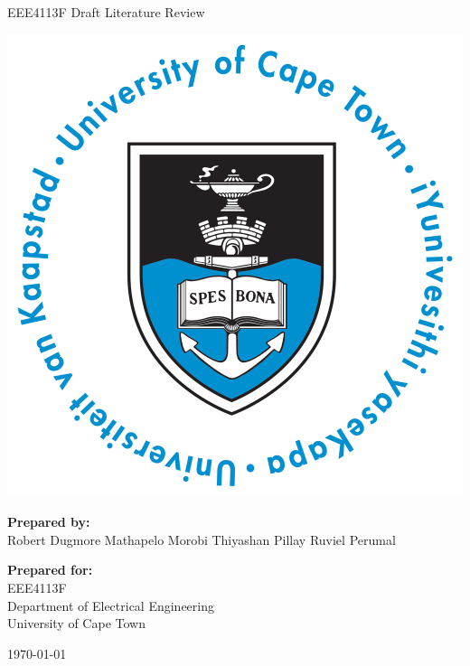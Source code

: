 \thispagestyle{empty}
\begin{center}
    
\Huge

\vspace{5cm}

EEE4113F Draft Literature Review

\vspace{2.5cm}

\includegraphics[width=0.4\linewidth]{FrontMatter/UCT_logo.png}

\vfill

\large
\textbf{Prepared by:}\\
Robert Dugmore
Mathapelo Morobi
Thiyashan Pillay
Ruviel Perumal

\vspace{1cm}

\textbf{Prepared for:}\\
EEE4113F\\
Department of Electrical Engineering\\
University of Cape Town

\vspace{2cm}

\today


\end{center}